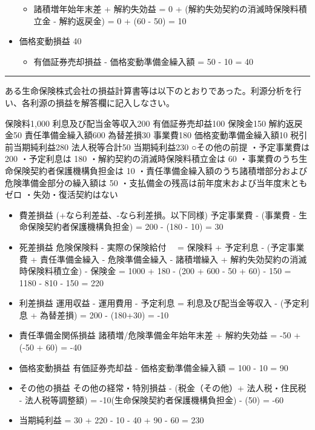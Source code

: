 \documentclass[report,gutter=10mm,fore-edge=10mm,uplatex,dvipdfmx]{jlreq}
\begin{document}
\begin{itemize}
  \begin{itemize}
  \tightlist
  \item
    諸積増年始年末差 + 解約失効益 = 0 +
    (解約失効契約の消滅時保険料積立金 - 解約返戻金) = 0 + (60 - 50) = 10
  \end{itemize}
\item
  価格変動損益 40

  \begin{itemize}
  \tightlist
  \item
    有価証券売却損益 - 価格変動準備金繰入額 = 50 - 10 = 40
  \end{itemize}
\end{itemize}

\begin{center}\rule{0.5\linewidth}{0.5pt}\end{center}


ある生命保険株式会社の損益計算書等は以下のとおりであった。利源分析を行い、各利源の損益を解答欄に記入しなさい。

保険料1,000 利息及び配当金等収入200 有価証券売却益100 保険金150
解約返戻金50 責任準備金繰入額600 為替差損30 事業費180
価格変動準備金繰入額10 税引前当期純利益280 法人税等合計50 当期純利益230
○その他の前提 ・予定事業費は 200 ・予定利息は 180
・解約契約の消滅時保険料積立金は 60
・事業費のうち生命保険契約者保護機構負担金は 10
・責任準備金繰入額のうち諸積増部分および危険準備金部分の繰入額は 50
・支払備金の残高は前年度末および当年度末ともゼロ ・失効・復活契約はない


\begin{itemize}
\tightlist
\item
  費差損益 (+なら利差益、-なら利差損。以下同様) 予定事業費 - (事業費 -
  生命保険契約者保護機構負担金) = 200 - (180 - 10) = 30
\item
  死差損益 危険保険料 - 実際の保険給付 　= 保険料 + 予定利息 -
  (予定事業費 + 責任準備金繰入 - 危険準備金繰入 - 諸積増繰入 +
  解約失効契約の消滅時保険料積立金) - 保険金 = 1000 + 180 - (200 + 600 -
  50 + 60) - 150 = 1180 - 810 - 150 = 220
\item
  利差損益 運用収益 - 運用費用 - 予定利息 = 利息及び配当金等収入 -
  (予定利息 + 為替差損) = 200 - (180+30) = -10
\item
  責任準備金関係損益 諸積増/危険準備金年始年末差 + 解約失効益 = -50 +
  (-50 + 60) = -40
\item
  価格変動損益 有価証券売却益 - 価格変動準備金繰入額 = 100 - 10 = 90
\item
  その他の損益 その他の経常・特別損益 - (税金（その他）+ 法人税・住民税
  - 法人税等調整額) = -10(生命保険契約者保護機構負担金) - (50) = -60
\item
  当期純利益 = 30 + 220 - 10 - 40 + 90 - 60 = 230
\end{itemize}
\end{document}
